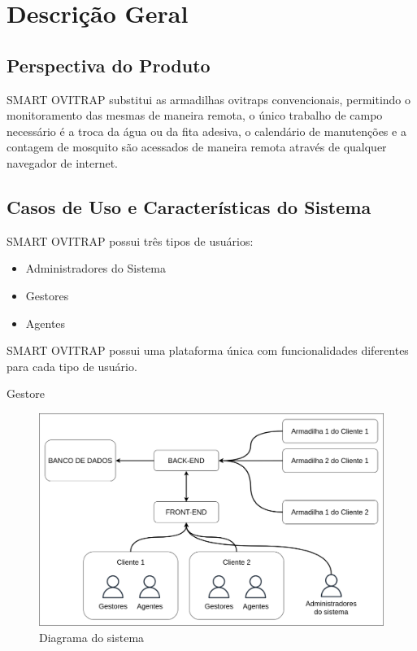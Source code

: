 \documentclass{scrreprt}
\begin{document}
	\newpage
	\chapter{Descrição Geral}
	
	\section{Perspectiva do Produto}
	SMART OVITRAP substitui as armadilhas ovitraps convencionais, permitindo o monitoramento das mesmas de maneira remota, o único trabalho de campo necessário é a troca da água ou da fita adesiva, o calendário de manutenções e a contagem de mosquito são acessados de maneira remota através de qualquer navegador de internet.
	
	\section{Casos de Uso e Características do Sistema}
	SMART OVITRAP possui três tipos de usuários:
	
	\begin{itemize}
		\item Administradores do Sistema
		\item Gestores
		\item Agentes
	\end{itemize}
	
	SMART OVITRAP possui uma plataforma única com funcionalidades diferentes para cada tipo de usuário.
	
	Gestore
	
	\begin{figure}[H]
		\centering
		\includegraphics[scale=0.3]{DiagramaPlataforma.png}
		\caption{Diagrama do sistema}
	\end{figure}
		
\end{document}
